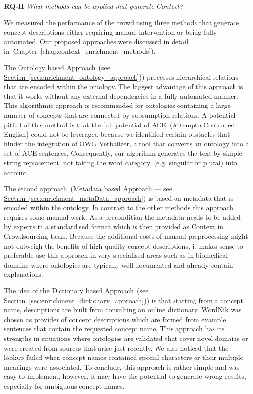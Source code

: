 \textbf{RQ-II} \emph{What methods can be applied that generate Context?}

We measured the performance of the crowd using three methods that generate concept descriptions either requiring manual intervention or being fully automated. Our proposed approaches were discussed in detail in~\hyperref[chap:context_enrichment_methods]{Chapter~\ref*{chap:context_enrichment_methods}}). 

The Ontology based Approach~(see \hyperref[sec:enrichment_ontology_approach]{Section~\ref*{sec:enrichment_ontology_approach}})) processes hierarchical relations that are encoded within the ontology. The biggest advantage of this approach is that it works without any external dependencies in a fully automated manner. This algorithmic approach is recommended for ontologies containing a large number of concepts that are connected by subsumption relations. A potential pitfall of this method is that the full potential of ACE~(Attempto Controlled English) could not be leveraged because we identified certain obstacles that hinder the integration of OWL~Verbalizer, a tool that converts an ontology into a set of ACE sentences. Consequently, our algorithm generates the text by simple string replacement, not taking the word category~(e.g. singular or plural) into account. 

The second approach~(Metadata based Approach --- see \hyperref[sec:enrichment_metaData_approach]{Section~\ref*{sec:enrichment_metaData_approach}})
is based on metadata that is encoded within the ontology. In contrast to the other methods this approach requires some manual work. As a precondition 
the metadata needs to be added by experts in a standardised format which is then provided as Context in Crowdsourcing tasks. Because the additional costs of manual preprocessing might not outweigh the benefits of high quality concept descriptions, it makes sense to preferable use this approach in very specialised areas such as in biomedical domains where ontologies are typically well documented and already contain explanations.

The idea of the Dictionary based Approach~(see \hyperref[sec:enrichment_dictionary_approach]{Section~\ref*{sec:enrichment_dictionary_approach}}))
is that starting from a concept name, descriptions are built from consulting an online dictionary. \hyperref[sec:wordnik]{WordNik} was chosen as provider of concept descriptions which are formed from example sentences that contain the requested concept name. This approach has its strengths in situations where ontologies are validated that cover novel domains or were created from sources that arise just recently. We also noticed that the lookup failed when concept names contained special characters or their multiple meanings were associated. 
To conclude, this approach is rather simple and was easy to implement, however, it may have the potential to generate wrong results, especially for ambiguous concept names. 


